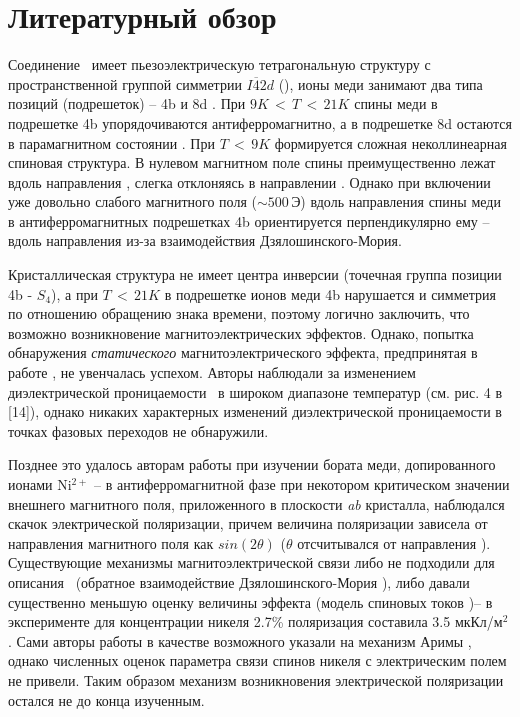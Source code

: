 \chapter{Литературный обзор}\label{ch:ch1}

Соединение \cbo\ имеет пьезоэлектрическую тетрагональную структуру с пространственной группой симметрии \(I\overline{4}2d\) (), ионы меди занимают два типа позиций (подрешеток) – 4b и 8d \cite{Martinez1971}. При \(9K\,{<}\,T\,{<}\,21K\) спины меди в подрешетке 4b упорядочиваются антиферромагнитно, а в подрешетке 8d остаются в парамагнитном состоянии \cite{Boehm2003}. При \(T\,{<}\,9K\) формируется сложная неколлинеарная спиновая структура. В нулевом магнитном поле спины преимущественно лежат вдоль направления , слегка отклоняясь в направлении  \cite{Boehm2003}. Однако при включении уже довольно слабого магнитного поля (\({\sim}500\,\)Э) вдоль направления  спины меди в антиферромагнитных подрешетках 4b ориентируется перпендикулярно ему – вдоль направления  \cite{Toyoda2019} из-за взаимодействия Дзялошинского-Мория.

Кристаллическая структура не имеет центра инверсии (точечная группа позиции 4b - \(S_4\)), а при \(T\,{<}\,21K\) в подрешетке ионов меди 4b нарушается и симметрия по отношению обращению знака времени, поэтому логично заключить, что возможно возникновение магнитоэлектрических эффектов. Однако, попытка обнаружения \emph{статического} магнитоэлектрического эффекта, предпринятая в работе \cite{Nenert2007}, не увенчалась успехом. Авторы наблюдали за изменением диэлектрической проницаемости \cbo\ в широком диапазоне температур (см. рис. 4 в [14]), однако никаких характерных изменений диэлектрической проницаемости в точках фазовых переходов не обнаружили.
 
Позднее это удалось авторам работы \cite{Khan2013} при изучении бората меди, допированного ионами Ni\(^{2+}\) – в антиферромагнитной фазе при некотором критическом значении внешнего магнитного поля, приложенного в плоскости \textit{ab} кристалла, наблюдался скачок электрической поляризации, причем величина поляризации зависела от направления магнитного поля как \(sin\left(2\theta\right)\) (\(\theta\) отсчитывался от направления ). 
Существующие механизмы магнитоэлектрической связи либо не подходили для описания \cbo\ (обратное взаимодействие Дзялошинского-Мория \cite{Sergienko2006}), либо давали существенно меньшую оценку величины эффекта (модель спиновых токов \cite{Katsura2005})– в эксперименте для концентрации никеля 2.7\% поляризация составила 3.5 мкКл/м\(^2\). Сами авторы работы \cite{Khan2013} в качестве возможного указали на механизм Аримы \cite{Arima2007}, однако численных оценок параметра связи спинов никеля с электрическим полем не привели. Таким образом механизм возникновения электрической поляризации остался не до конца изученным.

